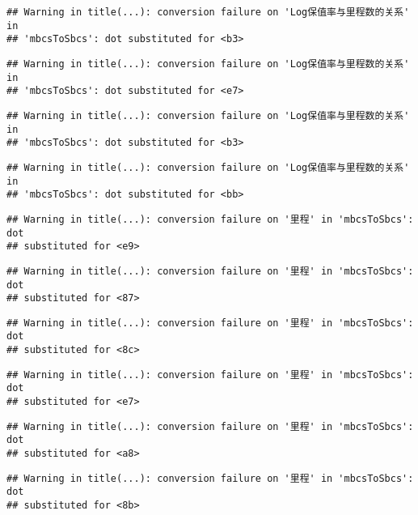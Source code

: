 \documentclass[]{article}
\begin{document}
\begin{verbatim}
## Warning in title(...): conversion failure on 'Log保值率与里程数的关系' in
## 'mbcsToSbcs': dot substituted for <b3>
\end{verbatim}

\begin{verbatim}
## Warning in title(...): conversion failure on 'Log保值率与里程数的关系' in
## 'mbcsToSbcs': dot substituted for <e7>
\end{verbatim}

\begin{verbatim}
## Warning in title(...): conversion failure on 'Log保值率与里程数的关系' in
## 'mbcsToSbcs': dot substituted for <b3>
\end{verbatim}

\begin{verbatim}
## Warning in title(...): conversion failure on 'Log保值率与里程数的关系' in
## 'mbcsToSbcs': dot substituted for <bb>
\end{verbatim}

\begin{verbatim}
## Warning in title(...): conversion failure on '里程' in 'mbcsToSbcs': dot
## substituted for <e9>
\end{verbatim}

\begin{verbatim}
## Warning in title(...): conversion failure on '里程' in 'mbcsToSbcs': dot
## substituted for <87>
\end{verbatim}

\begin{verbatim}
## Warning in title(...): conversion failure on '里程' in 'mbcsToSbcs': dot
## substituted for <8c>
\end{verbatim}

\begin{verbatim}
## Warning in title(...): conversion failure on '里程' in 'mbcsToSbcs': dot
## substituted for <e7>
\end{verbatim}

\begin{verbatim}
## Warning in title(...): conversion failure on '里程' in 'mbcsToSbcs': dot
## substituted for <a8>
\end{verbatim}

\begin{verbatim}
## Warning in title(...): conversion failure on '里程' in 'mbcsToSbcs': dot
## substituted for <8b>
\end{verbatim}
\end{document}
